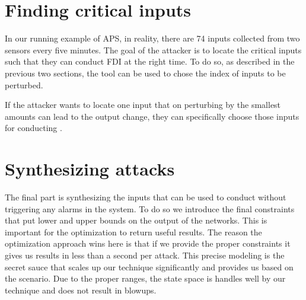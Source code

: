 \section{Finding critical inputs}
In our running example of APS, in reality, there are 74 inputs collected from two sensors every five minutes. The goal of the attacker is to locate the critical inputs such that they can conduct FDI at the right time. To do so, as described in the previous two sections, the tool can be used to chose the index of inputs to be perturbed. 

If the attacker wants to locate one input that on perturbing by the smallest amounts can lead to the output change, they can specifically choose those inputs for conducting \attack.

\label{section:cost function}
\section{Synthesizing attacks}
The final part is synthesizing the inputs that can be used to conduct \attack without triggering any alarms in the system. To do so we introduce the final constraints that put lower and upper bounds on the output of the networks. This is important for the optimization to return useful results. The reason the optimization approach wins here is that if we provide the proper constraints it gives us results in less than a second per attack. This precise modeling is the secret sauce that scales up our technique significantly and provides us \attack based on the scenario. Due to the proper ranges, the state space is handles well by our technique and does not result in blowups. 
